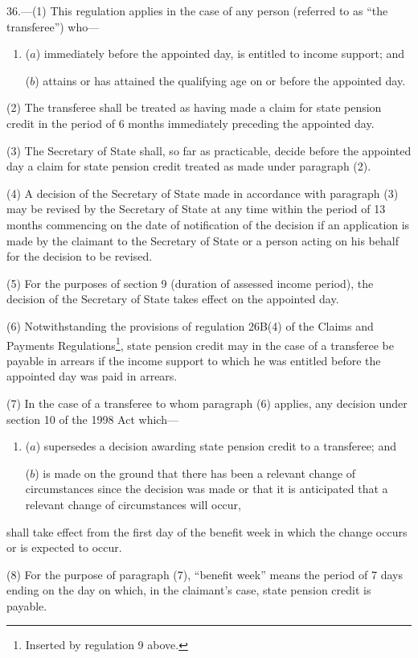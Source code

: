 \documentclass[12pt,a4paper]{article}
\begin{document}
36.---(1)  This regulation applies in the case of any person (referred to as “the transferee”) who—
\begin{enumerate}\item[]
($a$) immediately before the appointed day, is entitled to income support; and

($b$) attains or has attained the qualifying age on or before the appointed day.
\end{enumerate}

(2) The transferee shall be treated as having made a claim for state pension credit in the period of 6 months immediately preceding the appointed day.

(3) The Secretary of State shall, so far as practicable, decide before the appointed day a claim for state pension credit treated as made under paragraph (2).

(4) A decision of the Secretary of State made in accordance with paragraph (3) may be revised by the Secretary of State at any time within the period of 13 months commencing on the date of notification of the decision if an application is made by the claimant to the Secretary of State or a person acting on his behalf for the decision to be revised.

(5) For the purposes of section 9 (duration of assessed income period), the decision of the Secretary of State takes effect on the appointed day.

(6) Notwithstanding the provisions of regulation 26B(4) of the Claims and Payments Regulations\footnote{Inserted by regulation 9 above.}, state pension credit may in the case of a transferee be payable in arrears if the income support to which he was entitled before the appointed day was paid in arrears.

(7) In the case of a transferee to whom paragraph (6) applies, any decision under section 10 of the 1998 Act which—
\begin{enumerate}\item[]
($a$) supersedes a decision awarding state pension credit to a transferee; and

($b$) is made on the ground that there has been a relevant change of circumstances since the decision was made or that it is anticipated that a relevant change of circumstances will occur,
\end{enumerate}
shall take effect from the first day of the benefit week in which the change occurs or is expected to occur.

(8) For the purpose of paragraph (7), “benefit week” means the period of 7 days ending on the day on which, in the claimant’s case, state pension credit is payable.
\end{document}
